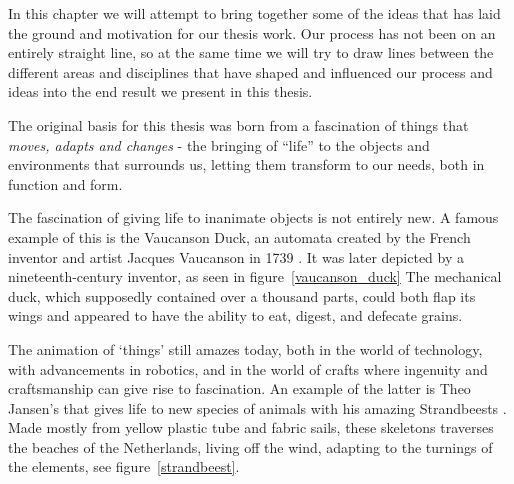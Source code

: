 In this chapter we will attempt to bring together some of the ideas that has laid the ground and motivation for our thesis work.
Our process has not been on an entirely straight line, so at the same time we will try to draw lines between the different areas and disciplines that have shaped and influenced our process and ideas into the end result we present in this thesis.  

The original basis for this thesis was born from a fascination of things that \emph{moves, adapts and changes} - the bringing of ``life'' to the objects and environments that surrounds us, letting them transform to our needs, both in function and form. 

The fascination of giving life to inanimate objects is not entirely new.
A famous example of this is the Vaucanson Duck, an automata created by the French inventor and artist Jacques Vaucanson in 1739 \citep{riskin2003defecating}.
It was later depicted by a nineteenth-century inventor, as seen in figure~\ref{vaucanson_duck} 
The mechanical duck, which supposedly contained over a thousand parts, could both flap its wings and appeared to have the ability to eat, digest, and defecate grains.

The animation of `things' still amazes today, both in the world of technology, with advancements in robotics, and in the world of crafts where ingenuity and craftsmanship can give rise to fascination.   
An example of the latter is Theo Jansen's that gives life to new species of animals with his amazing Strandbeests \cite{strandbeestJansen}.  
Made mostly from yellow plastic tube and fabric sails, these skeletons traverses the beaches of the Netherlands, living off the wind, adapting to the turnings of the elements, see figure~\ref{strandbeest}.

